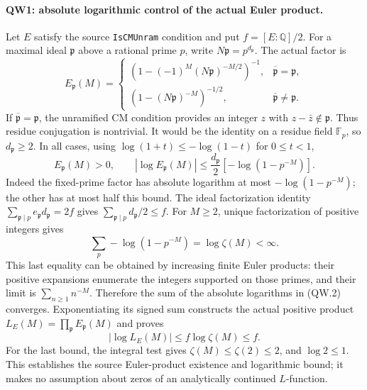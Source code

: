 \paragraph{QW1: absolute logarithmic control of the actual Euler product.}
Let $E$ satisfy the source \texttt{IsCMUnram} condition and put
$f=[E:\mathbb Q]/2$. For a maximal ideal $\mathfrak p$ above a rational
prime $p$, write $N\mathfrak p=p^{d_{\mathfrak p}}$. The actual factor is
\[
 E_{\mathfrak p}(M)=
 \begin{cases}
 (1-(-1)^M(N\mathfrak p)^{-M/2})^{-1},&
       \overline{\mathfrak p}=\mathfrak p,\\
 (1-(N\mathfrak p)^{-M})^{-1/2},&
       \overline{\mathfrak p}\ne\mathfrak p.
 \end{cases}                                                   \tag{QW.1}
\]
If $\overline{\mathfrak p}=\mathfrak p$, the unramified CM condition
provides an integer $z$ with $z-\bar z\notin\mathfrak p$. Thus residue
conjugation is nontrivial. It would be the identity on a residue field
$\mathbb F_p$, so $d_{\mathfrak p}\ge2$. In all cases, using
$\log(1+t)\le-\log(1-t)$ for $0\le t<1$,
\[
 E_{\mathfrak p}(M)>0,\qquad
 |\log E_{\mathfrak p}(M)|
 \le\frac{d_{\mathfrak p}}2[-\log(1-p^{-M})].                    \tag{QW.2}
\]
Indeed the fixed-prime factor has absolute logarithm at most
$-\log(1-p^{-M})$; the other has at most half this bound.
The ideal factorization identity
$\sum_{\mathfrak p\mid p}e_{\mathfrak p}d_{\mathfrak p}=2f$ gives
$\sum_{\mathfrak p\mid p}d_{\mathfrak p}/2\le f$.
For $M\ge2$, unique factorization of positive integers gives
\[
 \sum_p-\log(1-p^{-M})=\log\zeta(M)<\infty.
\]
This last equality can be obtained by increasing finite Euler products:
their positive expansions enumerate the integers supported on those
primes, and their limit is $\sum_{n\ge1}n^{-M}$.
Therefore the sum of the absolute logarithms in (QW.2) converges.
Exponentiating its signed sum constructs the actual positive product
$L_E(M)=\prod_{\mathfrak p}E_{\mathfrak p}(M)$ and proves
\[
               |\log L_E(M)|\le f\log\zeta(M)\le f.             \tag{QW.3}
\]
For the last bound, the integral test gives
$\zeta(M)\le\zeta(2)\le2$, and $\log2\le1$.
This establishes the source Euler-product existence and logarithmic
bound; it makes no assumption about zeros of an analytically continued
$L$-function.

